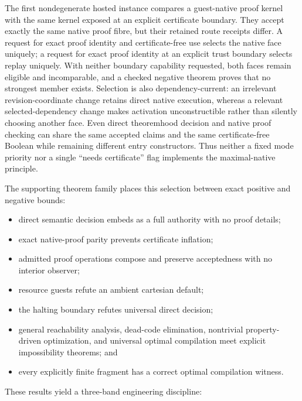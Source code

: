 \documentclass[11pt]{article}
\begin{document}
The first nondegenerate hosted instance compares a guest-native proof kernel
with the same kernel exposed at an explicit certificate boundary.  They accept
exactly the same native proof fibre, but their retained route receipts differ.
A request for exact proof identity and certificate-free use selects the native
face uniquely; a request for exact proof identity at an explicit trust boundary
selects replay uniquely.  With neither boundary capability requested, both
faces remain eligible and incomparable, and a checked negative theorem proves
that no strongest member exists.  Selection is also dependency-current: an
irrelevant revision-coordinate change retains direct native execution, whereas
a relevant selected-dependency change makes activation unconstructible rather
than silently choosing another face.  Even direct theoremhood decision and native
proof checking can share the same accepted claims and the same
certificate-free Boolean while remaining different entry constructors.  Thus
neither a fixed mode priority nor a single ``needs certificate'' flag implements
the maximal-native principle.

The supporting theorem family places this selection between exact positive and
negative bounds:

\begin{itemize}
\item direct semantic decision embeds as a full authority with no proof details;
\item exact native-proof parity prevents certificate inflation;
\item admitted proof operations compose and preserve acceptedness with no interior
  observer;
\item resource guests refute an ambient cartesian default;
\item the halting boundary refutes universal direct decision;
\item general reachability analysis, dead-code elimination, nontrivial
  property-driven optimization, and universal optimal compilation meet explicit
  impossibility theorems; and
\item every explicitly finite fragment has a correct optimal compilation witness.
\end{itemize}

These results yield a three-band engineering discipline:
\end{document}
